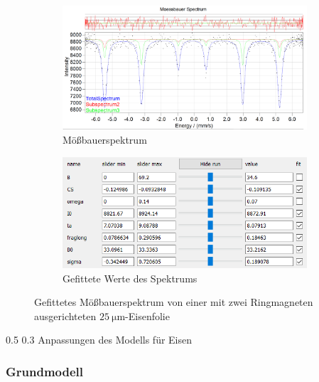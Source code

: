 \documentclass[german, %
parskip=full, %
bibliography=totoc, %
]{scrartcl}
\makeatletter
\renewcommand\subsection{\@startsection 
   {subsection}{2}{0mm}%
   {0.5\baselineskip}%
   {0.3\baselineskip}%
   {\bfseries\sffamily\large}%
   }
\makeatother
\begin{document}
\begin{figure}[ht]
	\centering
	\begin{subfigure}[b]{0.5\textwidth}
		\includegraphics[width=\textwidth]{MoessbauerEisen25MagnetRing}
	  \caption{Mößbauerspektrum}
	  \label{fig:moess25ring}
  \end{subfigure}
  \begin{subfigure}[b]{0.4\textwidth}
	  \includegraphics[width=\textwidth]{WerteEisen25MagnetRing}
	  \caption{Gefittete Werte des Spektrums}
	  \label{fig:werte25ring}
  \end{subfigure}
	\caption{Gefittetes Mößbauerspektrum von einer mit zwei Ringmagneten ausgerichteten \(\SI{25}{\micro\meter}\)-Eisenfolie}
	\label{fig:magnetring}
\end{figure}

\subsection{Anpassungen des Modells für Eisen}

\subsubsection{Grundmodell}
\end{document}
